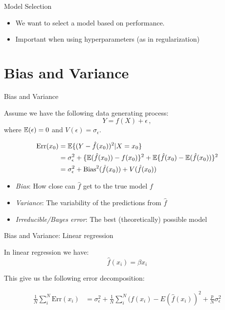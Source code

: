 \documentclass[10pt,handout]{beamer}
\begin{document}
\begin{frame}{Model Selection}
\begin{itemize}
\item We want to select a model based on performance.
\item Important when using hyperparameters (as in regularization)
\end{itemize}

\end{frame}


\section{Bias and Variance}


\begin{frame}{Bias and Variance}

Assume we have the following data generating process:
\[
Y = f(X) + \epsilon\,,
\]
where $\operatorname{\mathbb{E}}(\epsilon)=0$ and $V(\epsilon)=\sigma_\epsilon$.

\begin{align*}
\text{Err}(x_0) &= \operatorname{\mathbb{E}}\{(Y-\hat{f}(x_0))^2 | X = x_0\} \\
  &= \sigma^2_\epsilon + \{\operatorname{\mathbb{E}}(\hat{f}(x_0)) - f(x_0)\}^2 + \operatorname{\mathbb{E}}\{\hat{f}(x_0) - \operatorname{\mathbb{E}}(\hat{f}(x_0))\}^2 \\
  &= \sigma^2_\epsilon + \text{Bias}^2(\hat{f}(x_0)) + V(\hat{f}(x_0))
\end{align*}

\begin{itemize}
\item \emph{Bias}: How close can $\hat{f}$ get to the true model $f$
\item \emph{Variance}: The variability of the predictions from $\hat{f}$
\item \emph{Irreducible/Bayes error}: The best (theoretically) possible model
\end{itemize}

\end{frame}


\begin{frame}{Bias and Variance: Linear regression}

In linear regression we have:
\[
\hat{f}(x_i) = \hat{\beta} x_i
\]

This give us the following error decomposition:

\begin{align*}
\frac{1}{N}\sum^N_i \text{Err}(x_i) &= \sigma^2_\epsilon + \frac{1}{N}\sum^N_i (f(x_i) - E(\hat{f}(x_i))^2 + \frac{p}{N} \sigma^2_\epsilon
\end{align*}

\end{frame}
\end{document}
